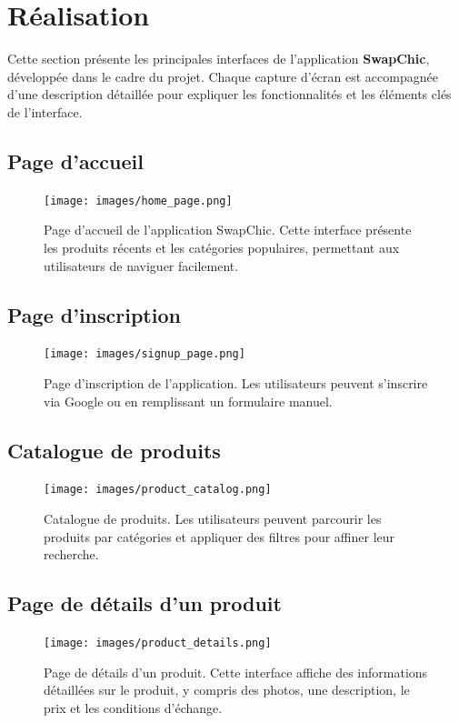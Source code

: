 \documentclass[12pt,a4paper]{report}
\begin{document}
	\section{Réalisation}
	Cette section présente les principales interfaces de l'application \textbf{SwapChic}, développée dans le cadre du projet. Chaque capture d'écran est accompagnée d'une description détaillée pour expliquer les fonctionnalités et les éléments clés de l'interface.
	
	\subsection{Page d'accueil}
	\begin{figure}[H]
		\centering
		\texttt{[image: images/home\_page.png]} %
		\caption{Page d'accueil de l'application SwapChic. Cette interface présente les produits récents et les catégories populaires, permettant aux utilisateurs de naviguer facilement.}
		\label{fig:home_page}
	\end{figure}
	
	\subsection{Page d'inscription}
	\begin{figure}[H]
		\centering
		\texttt{[image: images/signup\_page.png]} %
		\caption{Page d'inscription de l'application. Les utilisateurs peuvent s'inscrire via Google ou en remplissant un formulaire manuel.}
		\label{fig:signup_page}
	\end{figure}
	
	\subsection{Catalogue de produits}
	\begin{figure}[H]
		\centering
		\texttt{[image: images/product\_catalog.png]} %
		\caption{Catalogue de produits. Les utilisateurs peuvent parcourir les produits par catégories et appliquer des filtres pour affiner leur recherche.}
		\label{fig:product_catalog}
	\end{figure}
	
	\subsection{Page de détails d'un produit}
	\begin{figure}[H]
		\centering
		\texttt{[image: images/product\_details.png]} %
		\caption{Page de détails d'un produit. Cette interface affiche des informations détaillées sur le produit, y compris des photos, une description, le prix et les conditions d'échange.}
		\label{fig:product_details}
	\end{figure}
	
\end{document}
